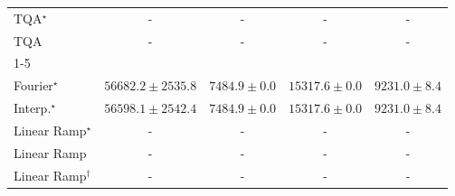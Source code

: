 \begin{tabular}{l|cccc|}
TQA$^\star$ & {\cellcolor[HTML]{000000}} \color[HTML]{F1F1F1} {\cellcolor{white}} \color{black} - & {\cellcolor[HTML]{000000}} \color[HTML]{F1F1F1} {\cellcolor{white}} \color{black} - & {\cellcolor[HTML]{000000}} \color[HTML]{F1F1F1} {\cellcolor{white}} \color{black} - & {\cellcolor[HTML]{000000}} \color[HTML]{F1F1F1} {\cellcolor{white}} \color{black} - \\
TQA & {\cellcolor[HTML]{000000}} \color[HTML]{F1F1F1} {\cellcolor{white}} \color{black} - & {\cellcolor[HTML]{000000}} \color[HTML]{F1F1F1} {\cellcolor{white}} \color{black} - & {\cellcolor[HTML]{000000}} \color[HTML]{F1F1F1} {\cellcolor{white}} \color{black} - & {\cellcolor[HTML]{000000}} \color[HTML]{F1F1F1} {\cellcolor{white}} \color{black} - \\
\cline{1-5}
\multicolumn{5}{c}{\rule{0pt}{8pt}PP} \\
\midrule
Fourier$^\star$ & {\cellcolor[HTML]{004529}} \color[HTML]{F1F1F1} $56682.2\pm 2535.8$ & {\cellcolor[HTML]{FEFFE1}} \color[HTML]{000000} $7484.9\pm 0.0$ & {\cellcolor[HTML]{EDF8B1}} \color[HTML]{000000} $15317.6\pm 0.0$ & {\cellcolor[HTML]{FCFED4}} \color[HTML]{000000} $9231.0\pm 8.4$ \\
Interp.$^\star$ & {\cellcolor[HTML]{004529}} \color[HTML]{F1F1F1} $56598.1\pm 2542.4$ & {\cellcolor[HTML]{FEFFE1}} \color[HTML]{000000} $7484.9\pm 0.0$ & {\cellcolor[HTML]{EDF8B1}} \color[HTML]{000000} $15317.6\pm 0.0$ & {\cellcolor[HTML]{FCFED4}} \color[HTML]{000000} $9231.0\pm 8.4$ \\
Linear Ramp$^\star$ & {\cellcolor[HTML]{000000}} \color[HTML]{F1F1F1} {\cellcolor{white}} \color{black} - & {\cellcolor[HTML]{000000}} \color[HTML]{F1F1F1} {\cellcolor{white}} \color{black} - & {\cellcolor[HTML]{000000}} \color[HTML]{F1F1F1} {\cellcolor{white}} \color{black} - & {\cellcolor[HTML]{000000}} \color[HTML]{F1F1F1} {\cellcolor{white}} \color{black} - \\
Linear Ramp & {\cellcolor[HTML]{000000}} \color[HTML]{F1F1F1} {\cellcolor{white}} \color{black} - & {\cellcolor[HTML]{000000}} \color[HTML]{F1F1F1} {\cellcolor{white}} \color{black} - & {\cellcolor[HTML]{000000}} \color[HTML]{F1F1F1} {\cellcolor{white}} \color{black} - & {\cellcolor[HTML]{000000}} \color[HTML]{F1F1F1} {\cellcolor{white}} \color{black} - \\
Linear Ramp$^\dagger$ & {\cellcolor[HTML]{000000}} \color[HTML]{F1F1F1} {\cellcolor{white}} \color{black} - & {\cellcolor[HTML]{000000}} \color[HTML]{F1F1F1} {\cellcolor{white}} \color{black} - & {\cellcolor[HTML]{000000}} \color[HTML]{F1F1F1} {\cellcolor{white}} \color{black} - & {\cellcolor[HTML]{000000}} \color[HTML]{F1F1F1} {\cellcolor{white}} \color{black} - \\

\end{tabular}
